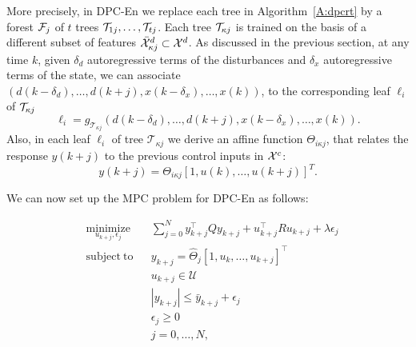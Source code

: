 \textcolor[rgb]{0,0,1}{More precisely, in DPC-En we replace each tree in Algorithm~\ref{A:dpcrt} by a forest $\mathcal{F}_j$ of $t$ trees $\mathcal{T}_{1j},\ldots,\mathcal{T}_{tj}$. Each tree $\mathcal{T}_{\kappa j}$ is trained on the basis of a different subset of features $\bar{\mathcal{X}}^d_{\kappa j} \subset \mathcal{X}^d$. As discussed in the previous section, at any time $k$, given $\delta_d$ autoregressive terms of the disturbances and $\delta_x$ autoregressive terms of the state, we can associate $( d(k-\delta_d),\ldots,d(k+j),x(k-\delta_x),\ldots,x(k) )$, to the corresponding leaf $\ell_i$ of $\mathcal{T}_{\kappa j}$
\begin{equation}\label{E:model_forest}
	\ell_i = \mathit{g}_{\mathcal{T}_{\kappa j}} \left( d(k-\delta_d),\ldots,d(k+j),x(k-\delta_x),\ldots,x(k)  \right).
\end{equation}
Also, in each leaf $\ell_i$ of tree $\mathcal{T}_{\kappa j}$ we derive an affine function $\Theta_{i \kappa j}$, that relates the response $y(k+j)$ to the previous control inputs in $\mathcal{X}^c$:
\begin{equation}\label{E:model_leaf_forest}
	y(k+j) =  \Theta_{i \kappa j} [1,u(k),\ldots,u(k+j) ]^T.
\end{equation}
}


\textcolor[rgb]{0,0,1}{We can now set up the MPC problem for DPC-En as follows:}
\begin{problem}\label{P:dpcrf}
	\begin{equation}
		\begin{aligned}
		& \underset{u_{k+j},\epsilon_j}{\mathrm{minimize}} & & \sum_{j=0}^{N} y^\top_{k+j} Q y_{k+j} + u^\top_{k+j} R u_{k+j} + \lambda\epsilon_j \\
		& \mathrm{subject\ to }                 & & y_{k+j}      =  \hat{\Theta}_{j} [1,u_{k},\ldots,u_{k+j} ]^\top                      \\
		&                                       & & u_{k+j}    \in  \mathcal{U}                                                        \\
		&                                       & & |y_{k+j}|  \leq \bar{y}_{k+j} + \epsilon_j 										 \\
		&                                       & & \epsilon_j \geq  0							                                     \\
		&                                       & & j           =    0,\ldots,N,            									         \\
		\end{aligned}
		\label{E:dpcrf}
	\end{equation}
\end{problem}

